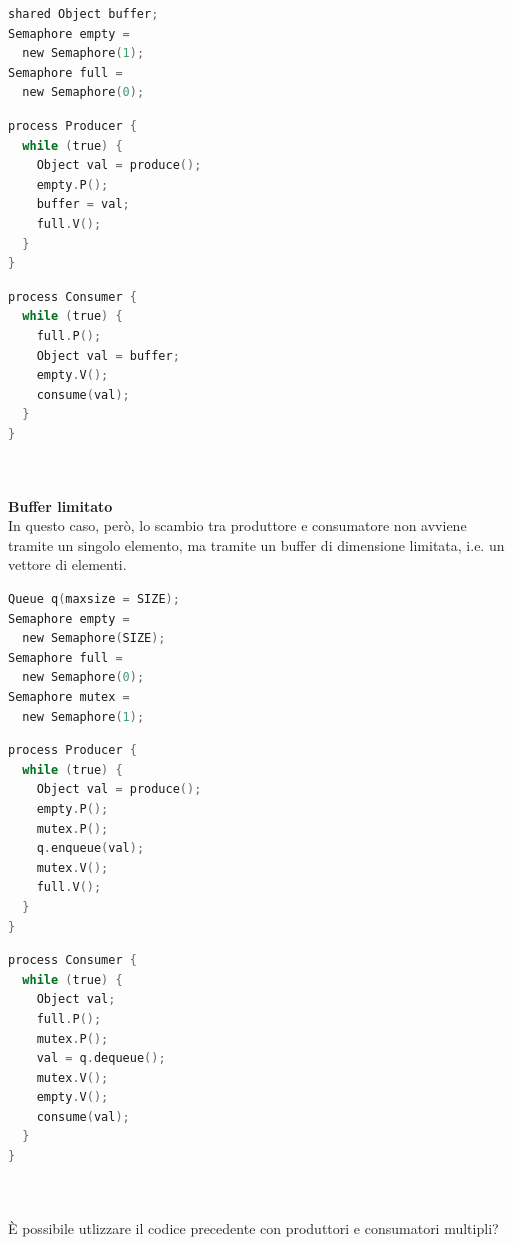 \documentclass[a4paper,12pt]{article}
\begin{document}
\begin{lstlisting}[language=C]
shared Object buffer;
Semaphore empty =
  new Semaphore(1);
Semaphore full =
  new Semaphore(0);
\end{lstlisting}
\begin{minipage}{0.48\textwidth}
\begin{lstlisting}[language=C]
process Producer {
  while (true) {
    Object val = produce();
    empty.P();
    buffer = val;
    full.V();
  }
}
\end{lstlisting}
\end{minipage}
\begin{minipage}{0.48\textwidth}
\begin{lstlisting}[language=C]
process Consumer {
  while (true) {
    full.P();
    Object val = buffer;
    empty.V();
    consume(val);
  }
}
\end{lstlisting}
\end{minipage}\\
\vspace{3em} \\
\textbf{Buffer limitato\\}
In questo caso, però, lo scambio tra produttore e consumatore non avviene tramite un singolo elemento, ma tramite un buffer di dimensione limitata, i.e. un vettore di elementi.
\begin{lstlisting}[language=C]
Queue q(maxsize = SIZE);
Semaphore empty =
  new Semaphore(SIZE);
Semaphore full =
  new Semaphore(0);
Semaphore mutex =
  new Semaphore(1);
\end{lstlisting}
\begin{minipage}{0.48\textwidth}
\begin{lstlisting}[language=C]
process Producer {
  while (true) {
    Object val = produce();
    empty.P();
    mutex.P();
    q.enqueue(val);
    mutex.V();
    full.V();
  }
}
\end{lstlisting}
\end{minipage}
\begin{minipage}{0.48\textwidth}
\begin{lstlisting}[language=C]
process Consumer {
  while (true) {
    Object val;
    full.P();
    mutex.P();
    val = q.dequeue();
    mutex.V();
    empty.V();
    consume(val);
  }
}
\end{lstlisting}
\end{minipage}\\
\vspace{15em} \\
È possibile utlizzare il codice precedente con produttori e consumatori multipli? \\
\end{document}
